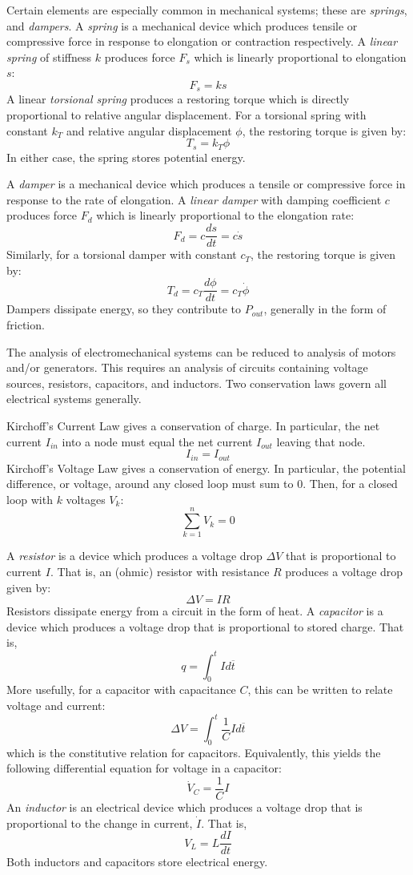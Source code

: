 Certain elements are especially common in mechanical systems; these are \textit{springs}, and \textit{dampers}. A \textit{spring} is a mechanical device which produces tensile or compressive force in response to elongation or contraction respectively. A \textit{linear spring} of stiffness $k$ produces force $F_s$ which is linearly proportional to elongation $s$: \[F_s = ks\] A linear \textit{torsional spring} produces a restoring torque which is directly proportional to relative angular displacement. For a torsional spring with constant $k_T$ and relative angular displacement $\phi$, the restoring torque is given by: \[T_s = k_T\phi\] In either case, the spring stores potential energy.

A \textit{damper} is a mechanical device which produces a tensile or compressive force in response to the rate of elongation. A \textit{linear damper} with damping coefficient $c$ produces force $F_d$ which is linearly proportional to the elongation rate: \[F_d = c\frac{ds}{dt}=c\dot s\] Similarly, for a torsional damper with constant $c_T$, the restoring torque is given by: \[T_d = c_T \frac{d\phi}{dt} = c_T\dot\phi\] Dampers dissipate energy, so they contribute to $P_{out}$, generally in the form of friction.

The analysis of electromechanical systems can be reduced to analysis of motors and/or generators. This requires an analysis of circuits containing voltage sources, resistors, capacitors, and inductors. Two conservation laws govern all electrical systems generally. 

Kirchoff's Current Law gives a conservation of charge. In particular, the net current $I_{in}$ into a node must equal the net current $I_{out}$ leaving that node. \[I_{in} = I_{out} \tag{Kirchoff's Current Law}\] Kirchoff's Voltage Law gives a conservation of energy. In particular, the potential difference, or voltage, around any closed loop must sum to $0$. Then, for a closed loop with $k$ voltages $V_k$: \[\sum_{k=1}^n V_k = 0\tag{Kirchoff's Voltage Law}\]

A \textit{resistor} is a device which produces a voltage drop $\Delta V$ that is proportional to current $I$. That is, an (ohmic) resistor with resistance $R$ produces a voltage drop given by: \[\Delta V=IR\tag{Ohm's Law}\] Resistors dissipate energy from a circuit in the form of heat. A \textit{capacitor} is a device which produces a voltage drop that is proportional to stored charge. That is, \[q = \int_0^t I d\overline{t}\] More usefully, for a capacitor with capacitance $C$, this can be written to relate voltage and current: \[\Delta V = \int_0^t \frac{1}{C} I d\overline{t}\] which is the constitutive relation for capacitors. Equivalently, this yields the following differential equation for voltage in a capacitor: \[\dot V_C = \frac{1}{C}I\] An \textit{inductor} is an electrical device which produces a voltage drop that is proportional to the change in current, $\dot I$. That is, \[V_L = L\frac{dI}{dt}\] Both inductors and capacitors store electrical energy.

